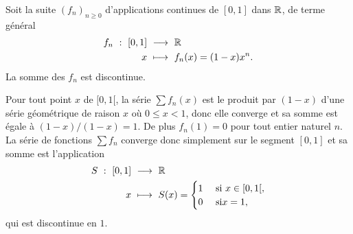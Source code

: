 \begin{prop}
    Soit la suite $(f_n)_{n \geqslant 0}$ d'applications continues de $[0,1]$ dans $\mathbb{R}$, de terme général
    \begin{alignat*}{2}
        f_n\ :\ [0,1]\ &\longrightarrow\ \mathbb{R}\\
        x\ &\longmapsto\ f_n(x) = (1-x)x^n.
    \end{alignat*}
    La somme des $f_n$ est discontinue.
\end{prop}

\begin{preuve}
    Pour tout point $x$ de $[0,1[$, la série $\sum f_n(x)$ est le produit par $(1-x)$ d'une série géométrique de raison $x$ où $0 \leqslant x < 1$, donc elle converge et sa somme est égale à $(1-x)/(1-x) = 1$. De plus $f_n(1) = 0$ pour tout entier naturel $n$. La série de fonctions $\sum f_n$ converge donc simplement sur le segment $[0,1]$ et sa somme est l'application 
    \begin{alignat*}{2}
        S\ :\ [0,1]\ &\longrightarrow\ \mathbb{R}\\
        x\ &\longmapsto\ S(x) =
        \begin{cases}
            1 &\text{ si } x \in [0,1[,\\
            0 &\text{ si} x = 1,
        \end{cases}
    \end{alignat*}
    qui est discontinue en $1$.
\end{preuve}
